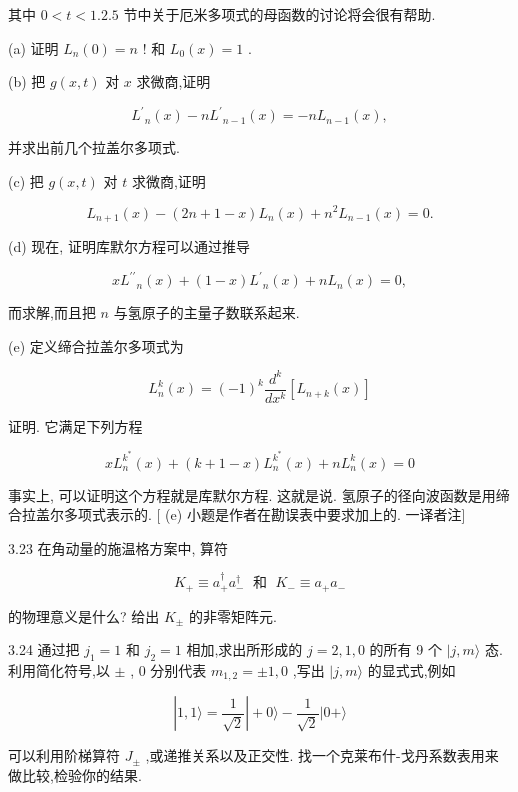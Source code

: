 其中 $0 < t < 1.{2.5}$ 节中关于厄米多项式的母函数的讨论将会很有帮助.

(a) 证明 ${L}_{n}\left( 0\right) = n$ ! 和 ${L}_{0}\left( x\right) = 1$ .

(b) 把 $g\left( {x, t}\right)$ 对 $x$ 求微商,证明

$$
{L}^{\prime }{}_{n}\left( x\right) - n{L}^{\prime }{}_{n - 1}\left( x\right) = - n{L}_{n - 1}\left( x\right) ,
$$

并求出前几个拉盖尔多项式.

(c) 把 $g\left( {x, t}\right)$ 对 $t$ 求微商,证明

$$
{L}_{n + 1}\left( x\right) - \left( {{2n} + 1 - x}\right) {L}_{n}\left( x\right) + {n}^{2}{L}_{n - 1}\left( x\right) = 0.
$$

(d) 现在, 证明库默尔方程可以通过推导

$$
x{L}^{\prime \prime }{}_{n}\left( x\right) + \left( {1 - x}\right) {L}^{\prime }{}_{n}\left( x\right) + n{L}_{n}\left( x\right) = 0,
$$

而求解,而且把 $n$ 与氢原子的主量子数联系起来.

(e) 定义缔合拉盖尔多项式为

$$
{L}_{n}^{k}\left( x\right) = {\left( -1\right) }^{k}\frac{{d}^{k}}{d{x}^{k}}\left\lbrack {{L}_{n + k}\left( x\right) }\right\rbrack
$$

证明. 它满足下列方程

$$
x{L}_{n}^{{k}^{ * }}\left( x\right) + \left( {k + 1 - x}\right) {L}_{n}^{{k}^{ * }}\left( x\right) + n{L}_{n}^{k}\left( x\right) = 0
$$

事实上, 可以证明这个方程就是库默尔方程. 这就是说. 氢原子的径向波函数是用缔合拉盖尔多项式表示的. [ (e) 小题是作者在勘误表中要求加上的. 一译者注]

3.23 在角动量的施温格方案中, 算符

$$
{K}_{ + } \equiv {a}_{ + }^{ \dagger }{a}_{ - }^{ \dagger }\;\text{ 和 }\;{K}_{ - } \equiv {a}_{ + }{a}_{ - }
$$

的物理意义是什么? 给出 ${K}_{ \pm }$ 的非零矩阵元.

3.24 通过把 ${j}_{1} = 1$ 和 ${j}_{2} = 1$ 相加,求出所形成的 $j = 2,1,0$ 的所有 9 个 $|j, m\rangle$ 态. 利用简化符号,以 $\pm$ , 0 分别代表 ${m}_{1,2} = \pm 1,0$ ,写出 $|j, m\rangle$ 的显式式,例如

$$
\left| {1,1\rangle = \frac{1}{\sqrt{2}}}\right| + 0\rangle - \frac{1}{\sqrt{2}}|0 + \rangle
$$

可以利用阶梯算符 ${J}_{ \pm }$ ,或递推关系以及正交性. 找一个克莱布什-戈丹系数表用来做比较,检验你的结果.

